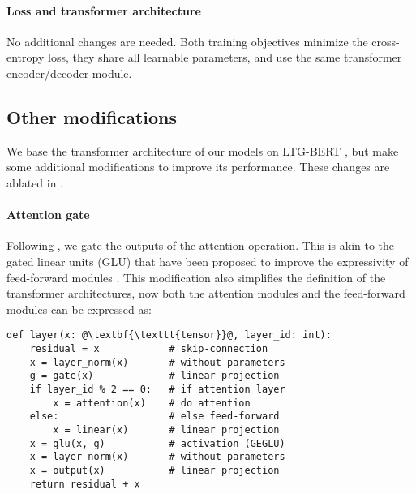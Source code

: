     \paragraph{Loss and transformer architecture} No additional changes are needed. Both training objectives minimize the cross-entropy loss, they share all learnable parameters, and use the same transformer encoder/decoder module.

\subsection{Other modifications}
\label{sec:modification}

We base the transformer architecture of our models on LTG-BERT \citep{samuel-etal-2023-trained}, but make some additional modifications to improve its performance. These changes are ablated in .

\paragraph{Attention gate}

Following , we gate the outputs of the attention operation. This is akin to the gated linear units (GLU) that have been proposed to improve the expressivity of feed-forward modules \citep{shazeer2020gluvariantsimprovetransformer}. This modification also simplifies the definition of the transformer architectures, now both the attention modules and the feed-forward modules can be expressed as:

\begin{verbatim}
def layer(x: @\textbf{\texttt{tensor}}@, layer_id: int):
    residual = x            # skip-connection
    x = layer_norm(x)       # without parameters
    g = gate(x)             # linear projection
    if layer_id % 2 == 0:   # if attention layer
        x = attention(x)    # do attention
    else:                   # else feed-forward
        x = linear(x)       # linear projection
    x = glu(x, g)           # activation (GEGLU)
    x = layer_norm(x)       # without parameters
    x = output(x)           # linear projection
    return residual + x
\end{verbatim}

